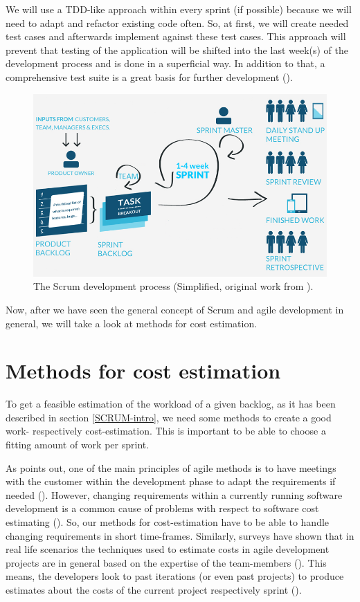 We will use a \ac{TDD}-like approach within every sprint (if possible) because we will need to adapt and refactor existing code often. So, at first, we will create needed test cases and afterwards implement against these test cases. This approach will prevent that testing of the application will be shifted into the last week(s) of the development process and is done in a superficial way. In addition to that, a comprehensive test suite is a great basis for further development (\cite{max03}).

\begin{figure}[th]
\centerline{\includegraphics[width=1\textwidth]{gfx/scrum}}
\caption{The Scrum development process (Simplified, original work from \cite{5_maxxor.com_2015}).}
\label{ScrumDia}
\end{figure}

Now, after we have seen the general concept of Scrum and agile development in general, we will take a look at methods for cost estimation. 

\section{Methods for cost estimation}
\label{cost}
To get a feasible estimation of the workload of a given backlog, as it has been described in section \ref{SCRUM-intro}, we need some methods to create a good work- respectively cost-estimation. This is important to be able to choose a fitting amount of work per sprint.

As \cite{Keaveney11} points out, one of the main principles of agile methods is to have meetings with the customer within the development phase to adapt the requirements if needed (\cite{Beck2001agile}). However, changing requirements within a currently running software development is a common cause of problems with respect to software cost estimating (\cite{jones2003flawed}). So, our methods for cost-estimation have to be able to handle changing requirements in short time-frames. Similarly, surveys have shown that in real life scenarios the techniques used to estimate costs in agile development projects are in general based on the expertise of the team-members (\cite{ceschi2005project}). This means, the developers look to past iterations (or even past projects) to produce estimates about the costs of the current project respectively sprint (\cite{ceschi2005project}). 

